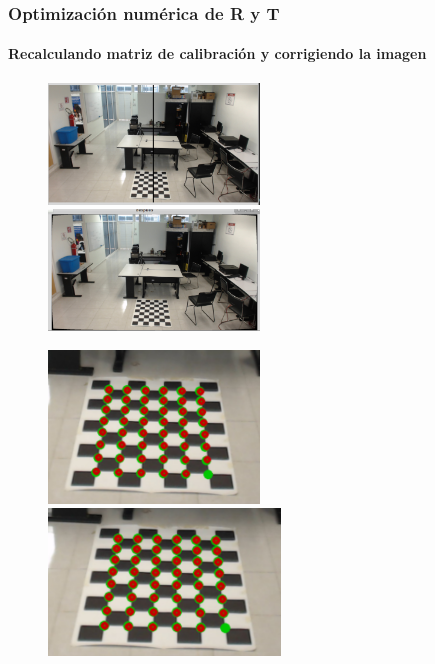 \documentclass[10pt, compress]{beamer}
\begin{document}
\begin{frame}[fragile]
	\frametitle{Optimización numérica de R y T}
	\framesubtitle{Recalculando matriz de calibración y corrigiendo la imagen}
	 \begin{figure}[htbp]
		 	\centering
		 	\includegraphics[width=0.5\textwidth]{./pictures/p1}
		 	\includegraphics[width=0.5\textwidth]{./pictures/p2}
	 \end{figure}
	 \begin{figure}[htbp]
		 	\includegraphics[width=0.5\textwidth]{./pictures/p4_2}
		 	\includegraphics[width=0.55\textwidth]{./pictures/p5_2}
	 \end{figure}	
\end{frame}
\end{document}
